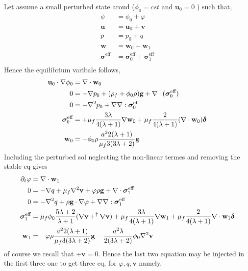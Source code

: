 Let assume a small perturbed state aroud ($\phi_0 = cst$ and $\textbf{u}_0 = 0$ ) such that, 
\begin{align*}
    \phi &= \phi_0 + \varphi\\
    \textbf{u} &= \textbf{u}_0 + \textbf{v}\\
    p &= p_0 + q\\
    \textbf{w} &= \textbf{w}_0 + \textbf{w}_1\\
    \bm\sigma^\text{eff} &= \bm\sigma^\text{eff}_0 + \bm\sigma^\text{eff}_1\\
\end{align*}
Hence the equilibrium varibale follows, 
\begin{align*}
    \textbf{u}_0\cdot \mathbf{\nabla} \phi_0  &= \mathbf{\nabla}\cdot\textbf{w}_0\\
    0 &= 
    - \mathbf{\nabla} p_0 
    + (\rho_f +\phi_0 \rho)\textbf{g}
    + \mathbf{\nabla}\cdot (\bm\sigma^\text{eff}_0) \\
    0 &= 
    - \mathbf{\nabla}^2 p_0  
    + \mathbf{\nabla}\mathbf{\nabla} : \bm\sigma^\text{eff}_0\\
    \bm\sigma^\text{eff}_0
    &=
    + \mu_f \frac{3\lambda}{4(\lambda+1)} 
    \mathbf{\nabla}\textbf{w}_0
    + \mu_f \frac{ 2}{4(\lambda+1)} (\mathbf{\nabla}\cdot\textbf{w}_0)  \bm\delta\\
    \textbf{w}_0 &= - \phi_0 \rho \frac{a^22(\lambda+1)}{\mu_f 3(3\lambda+2)}\textbf{g}\\
\end{align*} 
Including the perturbed sol neglecting the non-linear termes and removing the stable eq gives
\begin{align*}
    \partial_t \varphi &= \mathbf{\nabla}\cdot \textbf{w}_1\\
    0 &= 
    - \mathbf{\nabla}  q
    + \mu_f \mathbf{\nabla}^2\textbf{v}
    + \varphi \rho \textbf{g}
    + \mathbf{\nabla}\cdot \bm\sigma^\text{eff}_1 \\
    0 &= 
    - \mathbf{\nabla}^2 q
    + \rho \textbf{g}\cdot \mathbf{\nabla} \varphi 
    + \mathbf{\nabla}\mathbf{\nabla} : \bm\sigma^\text{eff}_1\\
    \bm\sigma^\text{eff}_1
    &=
     \mu_f \phi_0 \frac{5\lambda +2}{\lambda+1} (\mathbf{\nabla}\textbf{v}+^\dagger \mathbf{\nabla} \textbf{v})
    + \mu_f \frac{3\lambda}{4(\lambda+1)} 
    \mathbf{\nabla}  \textbf{w}_1
    + \mu_f \frac{ 2}{4(\lambda+1)} \mathbf{\nabla}\cdot  \textbf{w}_1  \bm\delta\\
    \textbf{w}_1 &= -  \varphi \rho \frac{a^22(\lambda+1)}{\mu_f 3(3\lambda+2)}\textbf{g} - \frac{a^2\lambda}{2(3\lambda+2)} \phi_0 \mathbf{\nabla}^2 \textbf{v} 
\end{align*} 
of course we recall that $\div \textbf{v}= 0$. 
Hence the last two equation may be injected in the first three one to get three eq, for $\varphi, q, \textbf{v}$ namely, 
